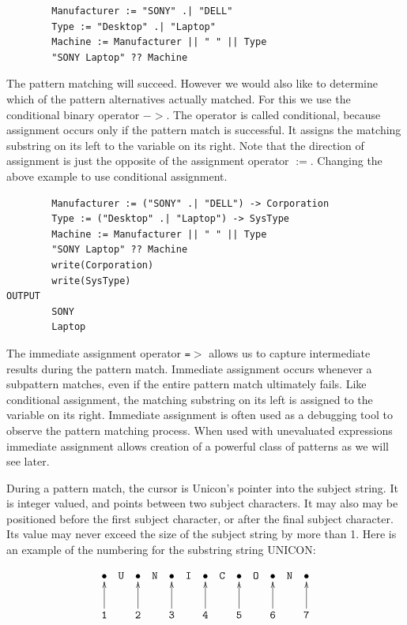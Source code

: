 \documentclass[letterpaper,12pt]{article}
\begin{document}
\begin{verbatim}
        Manufacturer := "SONY" .| "DELL"
        Type := "Desktop" .| "Laptop"
        Machine := Manufacturer || " " || Type
        "SONY Laptop" ?? Machine
\end{verbatim}

The pattern matching will succeed. However we would also like to
determine which of the pattern alternatives actually matched. For this
we use the conditional binary operator \(-\!\!>\). The operator is
called conditional, because assignment occurs only if the pattern
match is successful. It assigns the matching substring on its left to
the variable on its right. Note that the direction of assignment is
just the opposite of the assignment operator $:=$. Changing the above
example to use conditional assignment.

\begin{verbatim}
        Manufacturer := ("SONY" .| "DELL") -> Corporation
        Type := ("Desktop" .| "Laptop") -> SysType
        Machine := Manufacturer || " " || Type
        "SONY Laptop" ?? Machine
        write(Corporation)
        write(SysType)
OUTPUT
        SONY
        Laptop
\end{verbatim}

The immediate assignment operator \texttt{=$>$} allows us to capture
intermediate results during the pattern match. Immediate assignment
occurs whenever a subpattern matches, even if the entire pattern match
ultimately fails. Like conditional assignment, the matching substring
on its left is assigned to the variable on its right. Immediate
assignment is often used as a debugging tool to observe the pattern
matching process. When used with unevaluated expressions immediate
assignment allows creation of a powerful class of patterns as we will
see later.

During a pattern match, the cursor is Unicon's pointer into the
subject string. It is integer valued, and points between two subject
characters. It may also may be positioned before the first subject
character, or after the final subject character. Its value may never
exceed the size of the subject string by more than 1.  Here is an
example of the numbering for the substring string UNICON:

\begin{displaymath}
\xymatrix@C=4pt{ \bullet & {\tt U} &  \bullet & {\tt N} &  \bullet &
{\tt I} &  \bullet & {\tt C} & \bullet  & {\tt O} &  \bullet & {\tt N} &  \bullet \\
	  {\tt 1} \ar[u] &   & {\tt 2} \ar[u] &   & {\tt 3} \ar[u] &
	  & {\tt 4} \ar[u] &   & {\tt 5} \ar[u] &   & {\tt 6} \ar[u] &
	  & {\tt 7} \ar[u]
	}
\end{displaymath}
\end{document}
